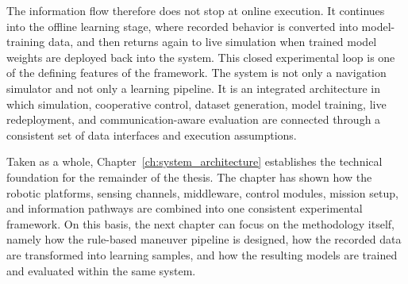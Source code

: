 The information flow therefore does not stop at online execution. It continues into the offline learning stage, where recorded behavior is converted into model-training data, and then returns again to live simulation when trained model weights are deployed back into the system. This closed experimental loop is one of the defining features of the framework. The system is not only a navigation simulator and not only a learning pipeline. It is an integrated architecture in which simulation, cooperative control, dataset generation, model training, live redeployment, and communication-aware evaluation are connected through a consistent set of data interfaces and execution assumptions.

Taken as a whole, Chapter~\ref{ch:system_architecture} establishes the technical foundation for the remainder of the thesis. The chapter has shown how the robotic platforms, sensing channels, middleware, control modules, mission setup, and information pathways are combined into one consistent experimental framework. On this basis, the next chapter can focus on the methodology itself, namely how the rule-based maneuver pipeline is designed, how the recorded data are transformed into learning samples, and how the resulting models are trained and evaluated within the same system.
